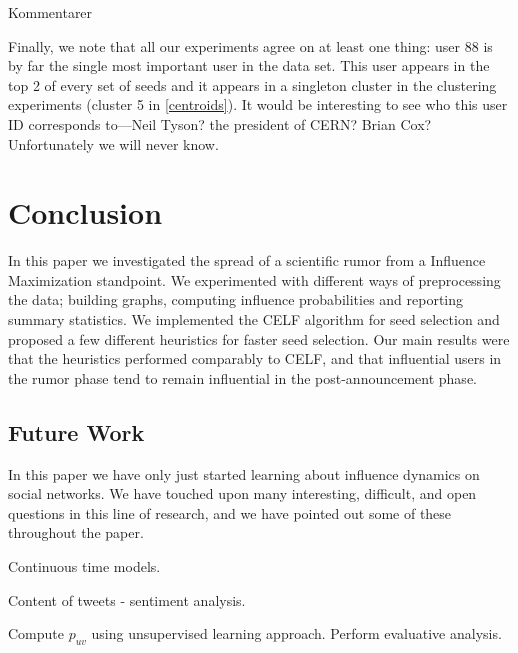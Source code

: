 \documentclass[sigconf]{acmart}
\def\red#1{{\color{red}#1}}
\begin{document}
\red{Kommentarer}

Finally, we note that all our experiments agree on at least one thing: user 88 is by far the single most important user in the data set. This user appears in the top 2 of every set of seeds and it appears in a singleton cluster in the clustering experiments (cluster 5 in \autoref{centroids}). It would be interesting to see who this user ID corresponds to---Neil Tyson? the president of CERN? Brian Cox? Unfortunately we will never know.

\section{Conclusion}

In this paper we investigated the spread of a scientific rumor from a Influence Maximization standpoint. We experimented with different ways of preprocessing the data; building graphs, computing influence probabilities and reporting summary statistics. We implemented the CELF algorithm for seed selection and proposed a few different heuristics for faster seed selection. Our main results were that the heuristics performed comparably to CELF, and that influential users in the rumor phase tend to remain influential in the post-announcement phase. 

\subsection{Future Work}

In this paper we have only just started learning about influence dynamics on social networks. We have touched upon many interesting, difficult, and open questions in this line of research, and we have pointed out some of these throughout the paper. 

Continuous time models. 

Content of tweets - sentiment analysis. 

Compute $p_{uv}$ using unsupervised learning approach. Perform evaluative analysis. 

\nocite{*}


\end{document}
